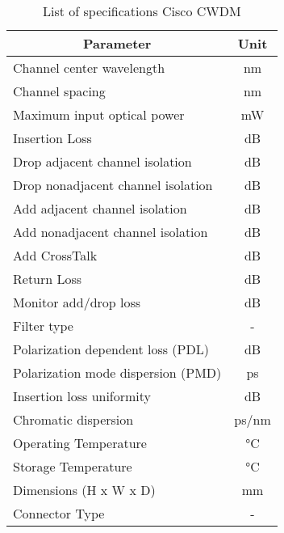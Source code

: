 \begin{table}[!ht]
	\centering
	\cite{noauthor_cisco_nodate-2}
	\begin{tabular} {|l|c|}
		\hline
		\multicolumn{1}{|c|}{\textbf{Parameter}} & \textbf{Unit} \\ \hline\hline
		Channel center wavelength & \unit{\nm} \\ \hline
		Channel spacing & \unit{\nm} \\ \hline
		Maximum input optical power & \unit{\mW} \\ \hline
		Insertion Loss & \unit{\dB} \\ \hline
		Drop adjacent channel isolation & \unit{\dB} \\ \hline
		Drop nonadjacent channel isolation & \unit{\dB} \\ \hline
		Add adjacent channel isolation & \unit{\dB} \\ \hline
		Add nonadjacent channel isolation & \unit{\dB} \\ \hline
		Add CrossTalk & \unit{\dB} \\ \hline
		Return Loss & \unit{\dB} \\ \hline
		Monitor add/drop loss & \unit{\dB} \\ \hline
		Filter type & - \\ \hline
		Polarization dependent loss (PDL) & \unit{\dB} \\ \hline
		Polarization mode dispersion (PMD) & \unit{\ps} \\ \hline
		Insertion loss uniformity & \unit{\dB} \\ \hline
		Chromatic dispersion & \unit{\ps/\nm} \\ \hline
		Operating Temperature & \unit{\degreeCelsius} \\ \hline
		Storage Temperature & \unit{\degreeCelsius} \\ \hline
		Dimensions (H x W x D) & \unit{\mm} \\ \hline
		Connector Type & - \\ \hline
	\end{tabular}
	\caption{List of specifications Cisco CWDM}
	\label{table:specs3}
\end{table}

